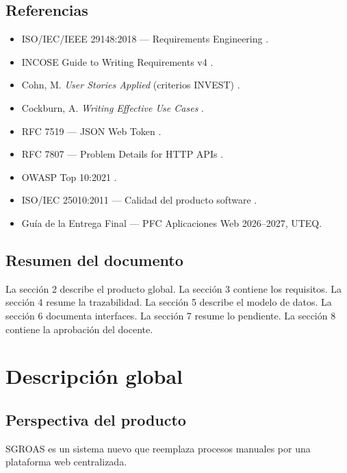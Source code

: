 \documentclass[12pt,a4paper]{article}
\begin{document}
\subsection{Referencias}
\begin{itemize}
  \item ISO/IEC/IEEE 29148:2018 --- Requirements Engineering \cite{iso29148}.
  \item INCOSE Guide to Writing Requirements v4 \cite{incose}.
  \item Cohn, M. \textit{User Stories Applied} (criterios INVEST) \cite{cohn2004}.
  \item Cockburn, A. \textit{Writing Effective Use Cases} \cite{cockburn2001}.
  \item RFC 7519 --- JSON Web Token \cite{rfc7519}.
  \item RFC 7807 --- Problem Details for HTTP APIs \cite{rfc7807}.
  \item OWASP Top 10:2021 \cite{owasp}.
  \item ISO/IEC 25010:2011 --- Calidad del producto software \cite{iso25010}.
  \item Guía de la Entrega Final --- PFC Aplicaciones Web 2026--2027, UTEQ.
\end{itemize}

\subsection{Resumen del documento}
La sección 2 describe el producto global. La sección 3 contiene los requisitos. La sección 4 resume la trazabilidad. La sección 5 describe el modelo de datos. La sección 6 documenta interfaces. La sección 7 resume lo pendiente. La sección 8 contiene la aprobación del docente.

\clearpage

\section{Descripción global}
\label{sec:descripcion}

\subsection{Perspectiva del producto}
SGROAS es un sistema nuevo que reemplaza procesos manuales por una plataforma web centralizada.
\end{document}
